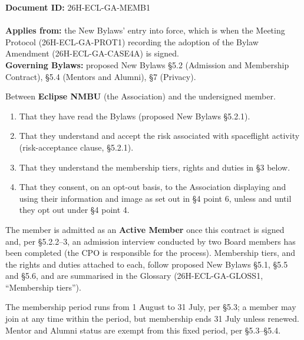 \documentclass{../../../Common/Latex/Templates/rapport}
\date{\meetingdate, \meetingtime}
\begin{document}
\makecoverpage
\tableofcontents
\reportmainmatter

\noindent\textbf{Document ID:} 26H-ECL-GA-MEMB1\\
\meetingline\\
\textbf{Applies from:} the New Bylaws' entry into force, which is when the Meeting Protocol (26H-ECL-GA-PROT1) recording the adoption of the Bylaw Amendment (26H-ECL-GA-CASE4A) is signed.\\
\textbf{Governing Bylaws:} proposed New Bylaws \S5.2 (Admission and Membership Contract), \S5.4 (Mentors and Alumni), \S7 (Privacy).

Between \textbf{Eclipse NMBU} (the Association) and the undersigned member.

\begin{enumerate}
  \item That they have read the Bylaws (proposed New Bylaws \S5.2.1).
  \item That they understand and accept the risk associated with spaceflight activity (risk-acceptance clause, \S5.2.1).
  \item That they understand the membership tiers, rights and duties in \S3 below.
  \item That they consent, on an opt-out basis, to the Association displaying and using their information and image as set out in \S4 point 6, unless and until they opt out under \S4 point 4.
\end{enumerate}

The member is admitted as an \textbf{Active Member} once this contract is signed and, per \S5.2.2--3, an admission interview conducted by two Board members has been completed (the CPO is responsible for the process). Membership tiers, and the rights and duties attached to each, follow proposed New Bylaws \S5.1, \S5.5 and \S5.6, and are summarised in the Glossary (26H-ECL-GA-GLOSS1, ``Membership tiers'').

The membership period runs from 1 August to 31 July, per \S5.3; a member may join at any time within the period, but membership ends 31 July unless renewed. Mentor and Alumni status are exempt from this fixed period, per \S5.3--\S5.4.
\end{document}
